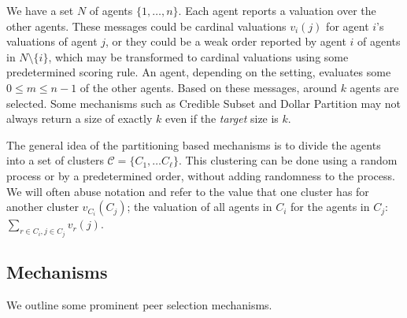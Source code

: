 \documentclass[letterpaper]{article}
\newcommand{\clusterset}{\ensuremath{\mathcal{C}}}
\begin{document}

We have a set $N$ of agents $\{1,\ldots, n\}$. Each agent reports a valuation over the other agents. These messages could be cardinal valuations $v_i(j)$ for agent $i$'s valuations of agent $j$, or they could be a weak order reported by agent $i$ of agents in $N\setminus \{i\}$, which may be transformed to cardinal valuations using some predetermined scoring rule. 
An agent, depending on the setting, evaluates some $0 \leq m \leq n-1$ of the other agents.
Based on these messages, around $k$ agents are selected.
Some mechanisms such as Credible Subset and Dollar Partition may not always return a size of exactly $k$ even if the \emph{target} size is $k$.



The general idea of the partitioning based mechanisms is to divide the agents into a set of clusters $\clusterset = \{C_1, \ldots C_{\ell}\}$. This clustering can be done using a random process or by a predetermined order, without adding randomness to the process. We will often abuse notation and refer to the value that one cluster has for another cluster $v_{C_i}(C_j)$; the valuation of all agents in $C_i$ for the agents in $C_j$: $\sum_{r \in C_i, j \in C_j} v_r(j)$.

\subsection{Mechanisms}

We outline some prominent peer selection mechanisms.
\end{document}
